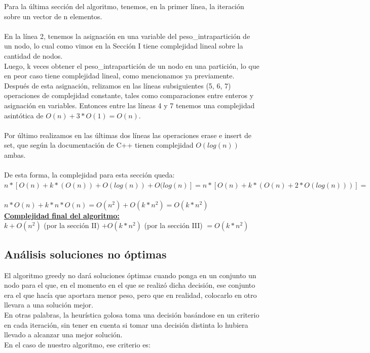 \documentclass[10pt,a4paper]{article}
\begin{document}
Para la última sección del algoritmo, tenemos, en la primer línea, la iteración sobre un vector de n elementos.\\\\
En la línea 2, tenemos la asignación en una variable del peso\_intrapartición de un nodo, lo cual como vimos en la Sección I tiene complejidad lineal sobre la cantidad de nodos.\\
Luego, k veces obtener el peso\_intrapartición de un nodo en una partición, lo que en peor caso tiene complejidad lineal, como mencionamos ya previamente. Después de esta asignación, relizamos en las líneas subsiguientes (5, 6, 7) operaciones de complejidad constante, tales como comparaciones entre enteros y asignación en variables. Entonces entre las líneas 4 y 7 tenemos una complejidad asintótica de $O(n) + 3*O(1) = O(n)$.\\\\
Por último realizamos en las últimas dos líneas las operaciones erase e insert de set, que según la documentación de C++ tienen complejidad $O(log(n))$ ambas.\\\\
De esta forma, la complejidad para esta sección queda:\\

$n*[O(n)+k*(O(n))+O(log(n))+O(log(n)] = n*[O(n)+k*(O(n) + 2*O(log(n)))] = $ \\\\
$n*O(n) + k*n*O(n) = O(n^2) + O(k*n^2) = O(k*n^2)$\\


\newpage
\textbf{\underline{Complejidad final del algoritmo:}}\\

$k +  O(n^2)$ (por la sección II) $+ O(k*n^2)$ (por la sección III) $=  O(k*n^2)$\\

\subsection{Análisis soluciones no óptimas}

El algoritmo greedy no dará soluciones óptimas cuando ponga en un conjunto un nodo para el que, en el momento en el que se realizó dicha decisión, ese conjunto era el que hacía que aportara menor peso, pero que en realidad, colocarlo en otro llevara a una solución mejor.\\
En otras palabras, la heurística golosa toma una decisión basándose en un criterio en cada iteración, sin tener en cuenta si tomar una decisión distinta lo hubiera llevado a alcanzar una mejor solución.\\
En el caso de nuestro algoritmo, ese criterio es:\\
\end{document}
